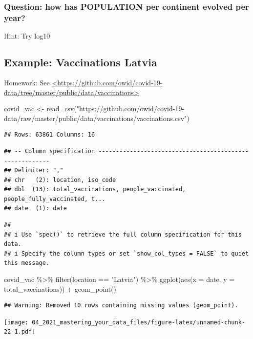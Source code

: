 \documentclass[
]{article}
\newenvironment{Shaded}{\begin{snugshade}}{\end{snugshade}}
\newcommand{\AttributeTok}[1]{\textcolor[rgb]{0.77,0.63,0.00}{#1}}
\newcommand{\FunctionTok}[1]{\textcolor[rgb]{0.00,0.00,0.00}{#1}}
\newcommand{\NormalTok}[1]{#1}
\newcommand{\OtherTok}[1]{\textcolor[rgb]{0.56,0.35,0.01}{#1}}
\newcommand{\SpecialCharTok}[1]{\textcolor[rgb]{0.00,0.00,0.00}{#1}}
\newcommand{\StringTok}[1]{\textcolor[rgb]{0.31,0.60,0.02}{#1}}
\begin{document}
\hypertarget{question-how-has-population-per-continent-evolved-per-year}{%
\subsubsection{Question: how has POPULATION per continent evolved per
year?}\label{question-how-has-population-per-continent-evolved-per-year}}

Hint: Try log10

\hypertarget{example-vaccinations-latvia}{%
\subsection{Example: Vaccinations
Latvia}\label{example-vaccinations-latvia}}

Homework: See
\href{https://github.com/owid/covid-19-data/tree/master/public/data/vaccinations}{\textless https://github.com/owid/covid-19-data/tree/master/public/data/vaccinations\textgreater{}}

\begin{Shaded}
\begin{Highlighting}[]
\NormalTok{covid\_vac }\OtherTok{\textless{}{-}} \FunctionTok{read\_csv}\NormalTok{(}\StringTok{"https://github.com/owid/covid{-}19{-}data/raw/master/public/data/vaccinations/vaccinations.csv"}\NormalTok{)}
\end{Highlighting}
\end{Shaded}

\begin{verbatim}
## Rows: 63861 Columns: 16
\end{verbatim}

\begin{verbatim}
## -- Column specification --------------------------------------------------------
## Delimiter: ","
## chr   (2): location, iso_code
## dbl  (13): total_vaccinations, people_vaccinated, people_fully_vaccinated, t...
## date  (1): date
\end{verbatim}

\begin{verbatim}
## 
## i Use `spec()` to retrieve the full column specification for this data.
## i Specify the column types or set `show_col_types = FALSE` to quiet this message.
\end{verbatim}

\begin{Shaded}
\begin{Highlighting}[]
\NormalTok{covid\_vac }\SpecialCharTok{\%\textgreater{}\%} 
  \FunctionTok{filter}\NormalTok{(location }\SpecialCharTok{==} \StringTok{"Latvia"}\NormalTok{) }\SpecialCharTok{\%\textgreater{}\%} 
  \FunctionTok{ggplot}\NormalTok{(}\FunctionTok{aes}\NormalTok{(}\AttributeTok{x =}\NormalTok{ date, }
             \AttributeTok{y =}\NormalTok{ total\_vaccinations)) }\SpecialCharTok{+} 
  \FunctionTok{geom\_point}\NormalTok{() }
\end{Highlighting}
\end{Shaded}

\begin{verbatim}
## Warning: Removed 10 rows containing missing values (geom_point).
\end{verbatim}

\texttt{[image: 04\_2021\_mastering\_your\_data\_files/figure-latex/unnamed-chunk-22-1.pdf]}
\end{document}
